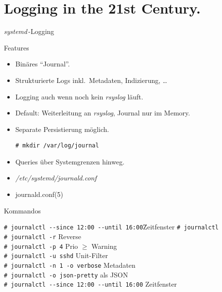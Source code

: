 \section[Logging]{Logging in the 21st Century.}

\begin{frame}{\emph{systemd}\,-Logging}
\begin{block}{Features}
\begin{itemize}
\item Binäres ``Journal''.
\item Strukturierte Logs inkl.~Metadaten, Indizierung, \dots
\item Logging auch wenn noch kein \emph{rsyslog} läuft.
\item Default: Weiterleitung an \emph{rsyslog}, Journal nur im Memory.
\item Separate Persistierung möglich.
\begin{lstlisting}
# mkdir /var/log/journal
\end{lstlisting}
\item Queries über Systemgrenzen hinweg.
\item \emph{/etc/systemd/journald.conf}
\item journald.conf(5)
\end{itemize}
\end{block}

\framebreak

\begin{block}{Kommandos}
\small
\begin{tabbing}
\quad\=\texttt{\# journalctl -{}-since 12:00 -{}-until 16:00}\quad\= Zeitfenster\kill
\>\texttt{\# journalctl} \> \\
\>\texttt{\# journalctl -r} \> Reverse \\
\>\texttt{\# journalctl -p 4} \> Prio $\ge$ Warning \\
\>\texttt{\# journalctl -u sshd} \> Unit-Filter \\
\>\texttt{\# journalctl -n 1 -o verbose} \> Metadaten \\
\>\texttt{\# journalctl -o json-pretty} \> als JSON \\
\>\texttt{\# journalctl -{}-since 12:00 -{}-until 16:00} \> Zeitfenster 
\end{tabbing}
\end{block}
\end{frame}



